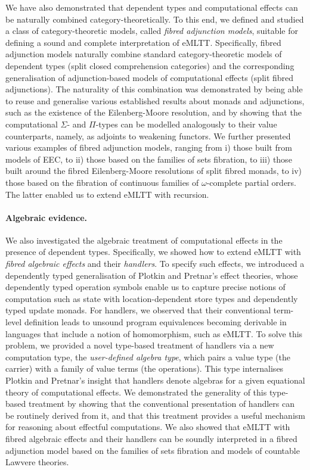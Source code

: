 We have also demonstrated that dependent types and computational effects can be naturally combined category-theoretically. To this end, we defined and studied a class of category-theoretic models, called \emph{fibred adjunction models}, suitable for defining a sound and complete interpretation of eMLTT. Specifically, fibred adjunction models naturally combine standard category-theoretic models of dependent types (split closed comprehension categories) and the corresponding generalisation of adjunction-based models of computational effects (split fibred adjunctions).
The naturality of this combination was demonstrated by being able to reuse and generalise various established results about monads and adjunctions, such as the existence of the Eilenberg-Moore resolution, and by showing that the computational $\Sigma$- and $\Pi$-types can be modelled analogously to their value counterparts, namely, as adjoints to weakening functors.
We further presented various examples of fibred adjunction models, ranging from i) those built from models of EEC, to ii) those based on the families of sets fibration, to iii) those built around the fibred Eilenberg-Moore resolutions of split fibred monads, to iv) those based on the fibration of continuous families of $\omega$-complete partial orders. The latter enabled us to extend eMLTT with recursion. 


\paragraph*{Algebraic evidence.}

We also investigated the algebraic treatment of computational effects in the presence of dependent types. Specifically, we showed how to extend eMLTT with \emph{fibred algebraic effects} and their \emph{handlers}. To specify such effects, we introduced a dependently typed generalisation of Plotkin and Pretnar's effect theories, whose dependently typed operation symbols enable us to capture precise notions of computation such as state with location-dependent store types and dependently typed update monads. For handlers, we observed that their conventional term-level definition leads to unsound program equivalences becoming derivable in languages that include a notion of homomorphism, such as eMLTT. To solve this problem, we provided a novel type-based treatment of handlers via a new computation type, the \emph{user-defined algebra type}, which pairs a value type (the carrier) with a family of value terms (the operations). This type internalises Plotkin and Pretnar's insight that handlers denote algebras for a given equational theory of computational effects. We demonstrated the generality of this type-based treatment by showing that the conventional presentation of handlers can be routinely derived from it, and that this treatment provides a useful mechanism for reasoning about effectful computations. We also showed that eMLTT with fibred algebraic effects and their handlers can be soundly interpreted in a fibred adjunction model based on the families of sets fibration and models of countable Lawvere theories.


